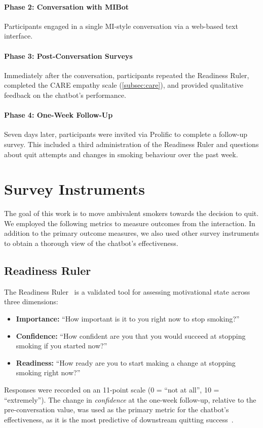 \paragraph{Phase 2: Conversation with MIBot}
Participants engaged in a single MI-style conversation via a web-based text interface.

\paragraph{Phase 3: Post-Conversation Surveys}
Immediately after the conversation, participants repeated the Readiness Ruler, completed the CARE empathy scale (\cref{subsec:care}), and provided qualitative feedback on the chatbot's performance.

\paragraph{Phase 4: One-Week Follow-Up}
Seven days later, participants were invited via Prolific to complete a follow-up survey. This included a third administration of the Readiness Ruler and questions about quit attempts and changes in smoking behaviour over the past week.

\section{Survey Instruments}
\label{subsec:survey-instruments}

The goal of this work is to move ambivalent smokers towards the decision to quit. We employed the following metrics to measure outcomes from the interaction. In addition to the primary outcome measures, we also used other survey instruments to obtain a thorough view of the chatbot's effectiveness.

\subsection{Readiness Ruler}
\label{subsec:readiness-ruler}
The Readiness Ruler~\citep{rollnick1992development} is a validated tool for assessing motivational state across three dimensions:
\begin{itemize}
	\item \textbf{Importance:} ``How important is it to you right now to stop smoking?''
	\item \textbf{Confidence:} ``How confident are you that you would succeed at stopping smoking if you started now?''
	\item \textbf{Readiness:} ``How ready are you to start making a change at stopping smoking right now?''
\end{itemize}
Responses were recorded on an 11-point scale (0 = ``not at all'', 10 = ``extremely''). The change in \emph{confidence} at the one-week follow-up, relative to the pre-conversation value, was used as the primary metric for the chatbot's effectiveness, as it is the most predictive of downstream quitting success~\citep{Gwaltney2009-wj,Abar2013}.

